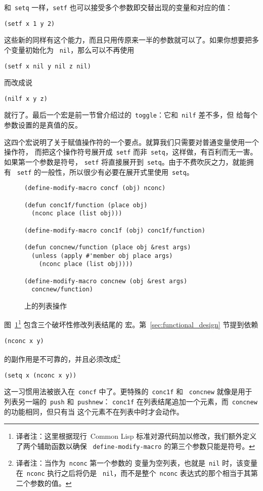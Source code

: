 和~\verb|setq| 一样，\verb|setf| 也可以接受多个参数\pozhehao{}即交替出现的变量和对应的值：
\begin{lstlisting}
(setf x 1 y 2)
\end{lstlisting}
这些新的\utility{}同样有这个能力，而且只用传原来一半的参数就可以了。如果你想要把多个变量初始化为
~\verb|nil|，那么可以不再使用
\begin{lstlisting}
(setf x nil y nil z nil)
\end{lstlisting}
而改成说
\begin{lstlisting}
(nilf x y z)
\end{lstlisting}
就行了。最后一个宏是前一节曾介绍过的~\verb|toggle|：它和~\verb|nilf| 差不多，但
给每个参数设置的是真值的反。

这四个宏说明了关于赋值操作符的一个要点。就算我们只需要对普通变量使用一个操作符，
而把这个操作符号展开成~\verb|setf| 而非~\verb|setq|，这样做，有百利而无一害。如果第一个参数是符号，
\verb|setf| 将直接展开到~\verb|setq|。由于不费吹灰之力，就能拥有
~\verb|setf| 的一般性，所以很少有必要在展开式里使用~\verb|setq|。

\begin{figure}
\begin{lstlisting}
(define-modify-macro concf (obj) nconc)

(defun conc1f/function (place obj)
  (nconc place (list obj)))

(define-modify-macro conc1f (obj) conc1f/function)

(defun concnew/function (place obj &rest args)
  (unless (apply #'member obj place args)
    (nconc place (list obj))))

(define-modify-macro concnew (obj &rest args)
  concnew/function)
\end{lstlisting}
  \caption{\gv{}上的列表操作}
  \label{fig:list_operations_on_generalized_variables}
\end{figure}

图~\ref{fig:list_operations_on_generalized_variables}\footnote{
译者注：这里根据现行~Common Lisp 标准对源代码加以修改，我们额外定义了两个辅助函数以确保
~\texttt{define-modify-macro} 的第三个参数只能是符号。} 包含三个破坏性修改列表结尾的
宏。第~\ref{sec:functional_design} 节提到依赖
\begin{lstlisting}
(nconc x y)
\end{lstlisting}
的副作用是不可靠的，并且必须改成\footnote{译者注：当作为~\texttt{nconc} 第一个参数的
变量为空列表，也就是~\texttt{nil} 时，该变量在~\texttt{nconc} 执行之后将仍是
~\texttt{nil}，而不是整个~\texttt{nconc} 表达式的那个相当于其第二个参数的值。}
\begin{lstlisting}
(setq x (nconc x y))
\end{lstlisting}
这一习惯用法被嵌入在~\verb|concf| 中了。更特殊的~\verb|conc1f| 和
~\verb|concnew| 就像是用于列表另一端的~\verb|push| 和~\verb|pushnew|：
\verb|conc1f| 在列表结尾追加一个元素，而~\verb|concnew| 的功能相同，但只有当
这个元素不在列表中时才会动作。

